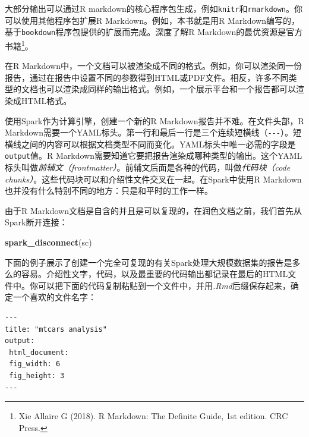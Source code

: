 \documentclass[
]{article}
\newenvironment{Shaded}{\begin{snugshade}}{\end{snugshade}}
\newcommand{\CommentTok}[1]{\textcolor[rgb]{0.56,0.35,0.01}{\textit{#1}}}
\newcommand{\DataTypeTok}[1]{\textcolor[rgb]{0.13,0.29,0.53}{#1}}
\newcommand{\KeywordTok}[1]{\textcolor[rgb]{0.13,0.29,0.53}{\textbf{#1}}}
\newcommand{\NormalTok}[1]{#1}
\newcommand{\OperatorTok}[1]{\textcolor[rgb]{0.81,0.36,0.00}{\textbf{#1}}}
\newcommand{\StringTok}[1]{\textcolor[rgb]{0.31,0.60,0.02}{#1}}
\begin{document}
大部分输出可以通过R
markdown的核心程序包生成，例如\texttt{knitr}和\texttt{rmarkdown}。你可以使用其他程序包扩展R
Markdown。例如，本书就是用R
Markdown编写的，基于\texttt{bookdown}程序包提供的扩展而完成。深度了解R
Markdown的最优资源是官方书籍\footnote{Xie Allaire G (2018). R Markdown:
  The Definite Guide, 1st edition. CRC Press.}。

在R
Markdown中，一个文档可以被渲染成不同的格式。例如，你可以渲染同一份报告，通过在报告中设置不同的参数得到HTML或PDF文件。相反，许多不同类型的文档也可以渲染成同样的输出格式。例如，一个展示平台和一个报告都可以渲染成HTML格式。

使用Spark作为计算引擎，创建一个新的R Markdown报告并不难。在文件头部，R
Markdown需要一个YAML标头。第一行和最后一行是三个连续短横线（\texttt{-\/-\/-}）。短横线之间的内容可以根据文档类型不同而变化。YAML标头中唯一必需的字段是\texttt{output}值。R
Markdown需要知道它要把报告渲染成哪种类型的输出。这个YAML标头叫做\emph{前辅文（frontmatter）}。前辅文后面是各种的代码，叫做\emph{代码块（code
chunks）}。这些代码块可以和介绍性文件交叉在一起。在Spark中使用R
Markdown也并没有什么特别不同的地方：只是和平时的工作一样。

由于R
Markdown文档是自含的并且是可以复现的，在润色文档之前，我们首先从Spark断开连接：

\begin{Shaded}
\begin{Highlighting}[]
\KeywordTok{spark_disconnect}\NormalTok{(sc)}
\end{Highlighting}
\end{Shaded}

下面的例子展示了创建一个完全可复现的有关Spark处理大规模数据集的报告是多么的容易。介绍性文字，代码，以及最重要的代码输出都记录在最后的HTML文件中。你可以把下面的代码复制粘贴到一个文件中，并用\emph{.Rmd}后缀保存起来，确定一个喜欢的文件名字：

\begin{verbatim}
---
title: "mtcars analysis"
output:
 html_document:
 fig_width: 6
 fig_height: 3
---
\end{verbatim}

\begin{Shaded}
\end{Shaded}
\end{document}
